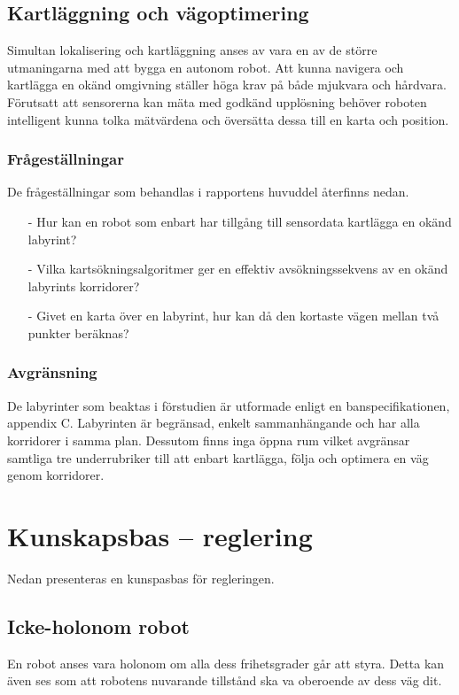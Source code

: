 \documentclass[11pt]{article}
\begin{document}
\begin{flushleft}
\subsection{Kartläggning och vägoptimering}
Simultan lokalisering och kartläggning anses av \cite{grail} vara en av de större utmaningarna med att bygga en autonom robot. Att kunna navigera och kartlägga en okänd omgivning ställer höga krav på både mjukvara och hårdvara. Förutsatt att sensorerna kan mäta med godkänd upplösning behöver roboten intelligent kunna tolka mätvärdena och översätta dessa till en karta och position. 

\subsubsection{Frågeställningar}
De frågeställningar som behandlas i rapportens huvuddel återfinns nedan.
\begin{itemize}
	\item [-] Hur kan en robot som enbart har tillgång till sensordata kartlägga en okänd labyrint?
	\item [-] Vilka kartsökningsalgoritmer ger en effektiv avsökningssekvens av en okänd labyrints korridorer?
	\item [-] Givet en karta över en labyrint, hur kan då den kortaste vägen mellan två punkter beräknas?
\end{itemize}
\subsubsection{Avgränsning}
De labyrinter som beaktas i förstudien är utformade enligt en banspecifikationen, appendix C. Labyrinten är begränsad, enkelt sammanhängande och har alla korridorer i samma plan. Dessutom finns inga öppna rum vilket avgränsar samtliga tre underrubriker till att enbart kartlägga, följa och optimera en väg genom korridorer. 


\pagebreak
\section{Kunskapsbas -- reglering}
Nedan presenteras en kunspasbas för regleringen.
\subsection{Icke-holonom robot}
En robot anses vara holonom om alla dess frihetsgrader går att styra. Detta kan även ses som att robotens nuvarande tillstånd ska va oberoende av dess väg dit. 


\end{flushleft}
\end{document}
